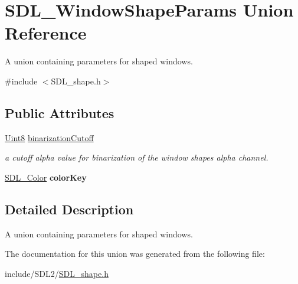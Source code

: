 \hypertarget{union_s_d_l___window_shape_params}{}\section{S\+D\+L\+\_\+\+Window\+Shape\+Params Union Reference}
\label{union_s_d_l___window_shape_params}


A union containing parameters for shaped windows.  




{\ttfamily \#include $<$S\+D\+L\+\_\+shape.\+h$>$}

\subsection*{Public Attributes}
\begin{DoxyCompactItemize}
\item 
\mbox{\label{union_s_d_l___window_shape_params_a534c40b09588a8075c0a70227753dc56}} 
\hyperlink{_s_d_l__stdinc_8h_a2944638813a090aa23e62f4da842c3e2}{Uint8} \hyperlink{union_s_d_l___window_shape_params_a534c40b09588a8075c0a70227753dc56}{binarization\+Cutoff}
\begin{DoxyCompactList}\small\item\em a cutoff alpha value for binarization of the window shape\textquotesingle{}s alpha channel. \end{DoxyCompactList}\item 
\mbox{\label{union_s_d_l___window_shape_params_a8bf3e442a51a1bbf452cfec7c1ed5318}} 
\hyperlink{struct_s_d_l___color}{S\+D\+L\+\_\+\+Color} {\bfseries color\+Key}
\end{DoxyCompactItemize}


\subsection{Detailed Description}
A union containing parameters for shaped windows. 

The documentation for this union was generated from the following file\+:\begin{DoxyCompactItemize}
\item 
include/\+S\+D\+L2/\hyperlink{_s_d_l__shape_8h}{S\+D\+L\+\_\+shape.\+h}\end{DoxyCompactItemize}
